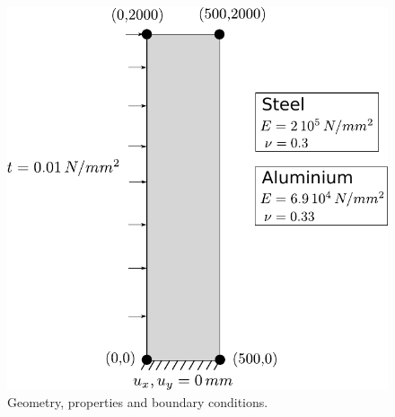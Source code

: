 \documentclass[12pt]{article}
\begin{document}
\vspace{2cm}

\begin{figure}[htp]
\begin{center}
\includegraphics[width=0.6\linewidth]{mast.pdf}
\caption{Geometry, properties and boundary conditions.}
\label{fig:geometry}
\end{center}
\end{figure}

\vspace{2cm}

\hrulefill

\end{document}
